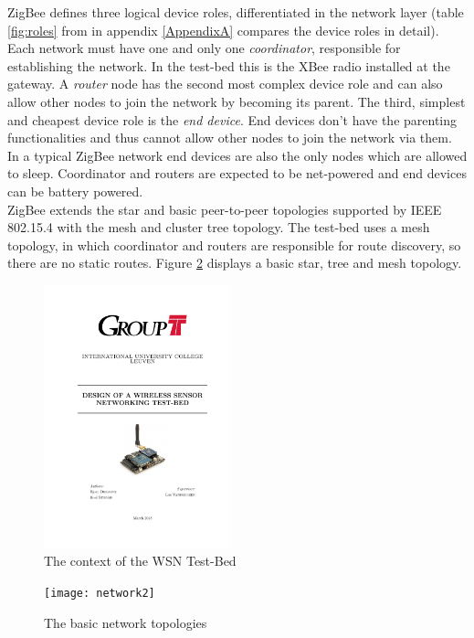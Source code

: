 \noindent
ZigBee defines three logical device roles, differentiated in the network layer (table \ref{fig:roles} from  in appendix \ref{AppendixA} compares the device roles in detail). Each network must have one and only one \textit{coordinator}, responsible for establishing the network. In the test-bed this is the XBee radio installed at the gateway. A \textit{router} node has the second most complex device role and can also allow other nodes to join the network by becoming its parent. The third, simplest and cheapest device role is the \textit{end device}.  End devices don't have the parenting functionalities and thus cannot allow other nodes to join the network via them. In a typical ZigBee network end devices are also the only nodes which are allowed to sleep. Coordinator and routers are expected to be net-powered and end devices can be battery powered.\\
ZigBee extends the star and basic peer-to-peer topologies supported by IEEE 802.15.4 with the mesh and cluster tree topology. The test-bed uses a mesh topology, in which coordinator and routers are responsible for route discovery, so there are no static routes.  Figure \ref{fig:network2} displays a basic star, tree and mesh topology.
\begin{figure}[htbp]
\centering
\includegraphics[width=0.48\textwidth]{thesis}
\caption{The context of the WSN Test-Bed}
\label{fig:thesis}
\end{figure}
\begin{figure}[htbp]
\centering
\texttt{[image: network2]}
\caption{The basic network topologies}
\label{fig:network2}
\end{figure}\\
\noindent
